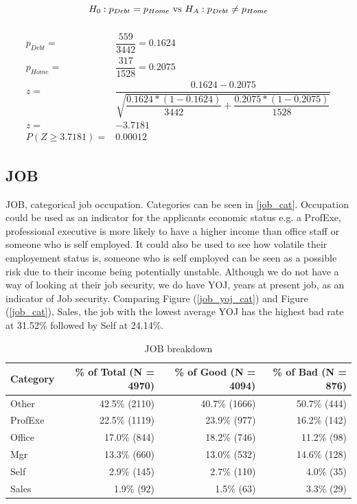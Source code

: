 \begin{equation}\label{Hypo}
H_{0}: p_{Debt} = p_{Home} \textup{ vs } H_{A}: p_{Debt} \neq p_{Home}
\end{equation}

\begin{equation}\label{TTest}
\begin{aligned}
\\
p_{Debt} =& \dfrac{559}{3442} = 0.1624\\
p_{Home} =& \dfrac{317}{1528} = 0.2075\\
z =& \dfrac{0.1624 - 0.2075}{\sqrt{\dfrac{0.1624 * (1 - 0.1624)}{3442} + \dfrac{0.2075 * (1 - 0.2075)}{1528}}} \\ 
z =& - 3.7181 \\
P(Z \geq 3.7181) =& 0.00012
\end{aligned}
\end{equation}

\subsection*{JOB}

JOB, categorical job occupation. Categories can be seen in \ref{job_cat}. Occupation could be used as an indicator for the applicants economic status e.g. a ProfExe, professional executive is more likely to have a higher income than office staff or someone who is self employed. It could also be used to see how volatile their employement status is, someone who is self employed can be seen as a possible risk due to their income being potentially unstable. Although we do not have a way of looking at their job security, we do have YOJ, years at present job, as an indicator of Job security. Comparing Figure (\ref{job_yoj_cat}) and Figure (\ref{job_cat}), Sales, the job with the lowest average YOJ has the highest bad rate at 31.52\% followed by Self at 24.14\%. 

\begin{table}[H]
	\centering
	\renewcommand{\arraystretch}{2}
	\begin{tabular}{lrrr}
		\toprule
		Category & \% of Total (N = 4970) & \% of Good (N = 4094) & \% of Bad (N = 876) \\
		\midrule
		Other & 42.5\% (2110) & 40.7\% (1666) &  50.7\% (444)  \\
		ProfExe & 22.5\% (1119) & 23.9\% (977) &  16.2\% (142)  \\
		Office & 17.0\% (844) & 18.2\% (746) &  11.2\% (98)  \\
		Mgr &  13.3\% (660) & 13.0\% (532) & 14.6\% (128)  \\
		Self & 2.9\% (145) & 2.7\% (110) &  4.0\% (35)  \\
		Sales & 1.9\% (92) & 1.5\% (63) &  3.3\% (29)  \\
		\bottomrule
	\end{tabular}
	\caption{JOB breakdown \label{job_count_tbl}}
\end{table}

